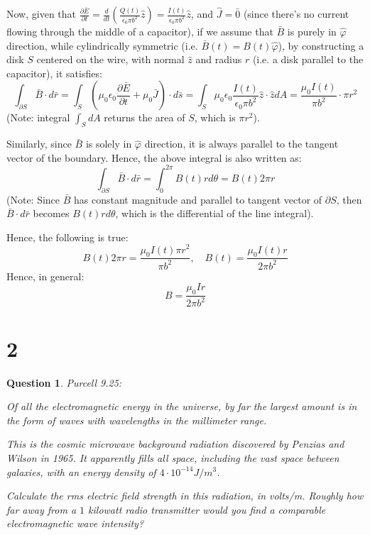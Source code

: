 \documentclass{article}
\newtheorem{question}{Question}
\begin{document}
Now, given that $\frac{\partial \bar{E}}{\partial t} = \frac{d}{dt}\left(\frac{Q(t)}{\epsilon_0 \pi b^2}\hat{z}\right) = \frac{I(t)}{\epsilon_0 \pi b^2}\hat{z}$, and $\hat{J}=\bar{0}$ 
(since there's no current flowing through the middle of a capacitor),
if we assume that $\bar{B}$ is purely in $\hat{\varphi}$ direction, while cylindrically symmetric (i.e. $\bar{B}(t)=B(t)\hat{\varphi}$),
by constructing a disk $S$ centered on the wire, with normal $\hat{z}$ and radius $r$ (i.e. a disk parallel to the capacitor), it satisfies:
$$\int_{\partial S}\bar{B}\cdot d\bar{r}=\int_{S}\left(\mu_0\epsilon_0\frac{\partial \bar{E}}{\partial t}+\mu_0\bar{J}\right)\cdot d\bar{s} = \int_{S}\mu_0\epsilon_0\frac{I(t)}{\epsilon_0\pi b^2}\hat{z}\cdot \hat{z}dA = \frac{\mu_0 I(t)}{\pi b^2}\cdot \pi r^2$$
(Note: integral $\int_SdA$ returns the area of $S$, which is $\pi r^2$).

Similarly, since $\bar{B}$ is solely in $\hat{\varphi}$ direction, it is always parallel to the tangent vector of the boundary. Hence, the above integral is also written as:
$$\int_{\partial S}\bar{B}\cdot d\bar{r} = \int_{0}^{2\pi}B(t)rd\theta = B(t)2\pi r$$
(Note: Since $\bar{B}$ has constant magnitude and parallel to tangent vector of $\partial S$, then $\bar{B}\cdot d\bar{r}$ becomes $B(t) rd\theta$, which is the differential of the line integral).

Hence, the following is true:
$$B(t)2\pi r=\frac{\mu_0 I(t)\pi r^2}{\pi b^2},\quad B(t)=\frac{\mu_0 I(t)r}{2\pi b^2}$$
Hence, in general:
$$B=\frac{\mu_0Ir}{2\pi b^2}$$

\hfil

\hfil

\section*{2}
\begin{myBox}[]{}
    \begin{question}
        Purcell 9.25:

        Of all the electromagnetic energy in the universe, by far the largest
        amount is in the form of waves with wavelengths in the millimeter range. 
        
        This is the cosmic microwave background radiation discovered 
        by Penzias and Wilson in 1965. It apparently fills all space,
        including the vast space between galaxies, with an energy density
        of $4\cdot 10^{-14} J/m^3$. 
        
        Calculate the rms electric field strength in
        this radiation, in volts/m. Roughly how far away from a $1$ kilowatt 
        radio transmitter would you find a comparable electromagnetic wave intensity?
    \end{question}
\end{myBox}
\end{document}
